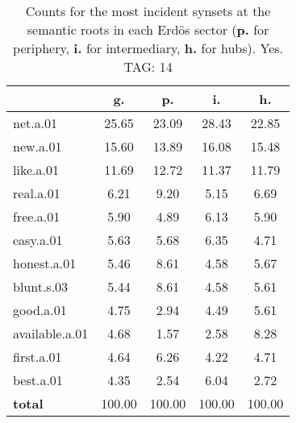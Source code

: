 \begin{table}[h!]
\begin{center}
\begin{tabular}{| l || c | c | c | c |}\hline
 & {\bf g.} & {\bf p.} & {\bf i.} & {\bf h.} \\\hline\hline
net.a.01 & 25.65  & 23.09  & 28.43  & 22.85 \\\hline
new.a.01 & 15.60  & 13.89  & 16.08  & 15.48 \\\hline
like.a.01 & 11.69  & 12.72  & 11.37  & 11.79 \\\hline
real.a.01 & 6.21  & 9.20  & 5.15  & 6.69 \\\hline
free.a.01 & 5.90  & 4.89  & 6.13  & 5.90 \\\hline
easy.a.01 & 5.63  & 5.68  & 6.35  & 4.71 \\\hline
honest.a.01 & 5.46  & 8.61  & 4.58  & 5.67 \\\hline
blunt.s.03 & 5.44  & 8.61  & 4.58  & 5.61 \\\hline
good.a.01 & 4.75  & 2.94  & 4.49  & 5.61 \\\hline
available.a.01 & 4.68  & 1.57  & 2.58  & 8.28 \\\hline
first.a.01 & 4.64  & 6.26  & 4.22  & 4.71 \\\hline
best.a.01 & 4.35  & 2.54  & 6.04  & 2.72 \\\hline\hline
{{\bf total}} & 100.00  & 100.00  & 100.00  & 100.00 \\\hline
\end{tabular}
\caption{Counts for the most incident synsets at the semantic roots in each Erd\"os sector ({\bf p.} for periphery, {\bf i.} for intermediary, {\bf h.} for hubs). Yes. TAG: 14}
\end{center}
\end{table}